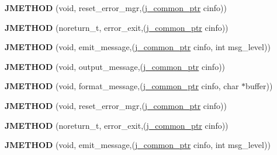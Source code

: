 \begin{DoxyCompactItemize}
\mbox{\label{structjpeg__error__mgr_ac676478083167b3731995d7901bd4b6c}} 
{\bfseries J\+M\+E\+T\+H\+OD} (void, reset\+\_\+error\+\_\+mgr,(\hyperlink{structjpeg__common__struct}{j\+\_\+common\+\_\+ptr} cinfo))
\item 
\mbox{\label{structjpeg__error__mgr_a72c40bceda2e6cb78046165e6892ac3a}} 
{\bfseries J\+M\+E\+T\+H\+OD} (noreturn\+\_\+t, error\+\_\+exit,(\hyperlink{structjpeg__common__struct}{j\+\_\+common\+\_\+ptr} cinfo))
\item 
\mbox{\label{structjpeg__error__mgr_a73c0a027b6e6cb8ff2b7b0fc42f756f9}} 
{\bfseries J\+M\+E\+T\+H\+OD} (void, emit\+\_\+message,(\hyperlink{structjpeg__common__struct}{j\+\_\+common\+\_\+ptr} cinfo, int msg\+\_\+level))
\item 
\mbox{\label{structjpeg__error__mgr_ac2989f8ef34acdd78ce26a9110a1c094}} 
{\bfseries J\+M\+E\+T\+H\+OD} (void, output\+\_\+message,(\hyperlink{structjpeg__common__struct}{j\+\_\+common\+\_\+ptr} cinfo))
\item 
\mbox{\label{structjpeg__error__mgr_a5f1dfb51c337c36ae1bc5fae7f84528f}} 
{\bfseries J\+M\+E\+T\+H\+OD} (void, format\+\_\+message,(\hyperlink{structjpeg__common__struct}{j\+\_\+common\+\_\+ptr} cinfo, char $\ast$buffer))
\item 
\mbox{\label{structjpeg__error__mgr_ac676478083167b3731995d7901bd4b6c}} 
{\bfseries J\+M\+E\+T\+H\+OD} (void, reset\+\_\+error\+\_\+mgr,(\hyperlink{structjpeg__common__struct}{j\+\_\+common\+\_\+ptr} cinfo))
\item 
\mbox{\label{structjpeg__error__mgr_a72c40bceda2e6cb78046165e6892ac3a}} 
{\bfseries J\+M\+E\+T\+H\+OD} (noreturn\+\_\+t, error\+\_\+exit,(\hyperlink{structjpeg__common__struct}{j\+\_\+common\+\_\+ptr} cinfo))
\item 
\mbox{\label{structjpeg__error__mgr_a73c0a027b6e6cb8ff2b7b0fc42f756f9}} 
{\bfseries J\+M\+E\+T\+H\+OD} (void, emit\+\_\+message,(\hyperlink{structjpeg__common__struct}{j\+\_\+common\+\_\+ptr} cinfo, int msg\+\_\+level))
\item 

\end{DoxyCompactItemize}
